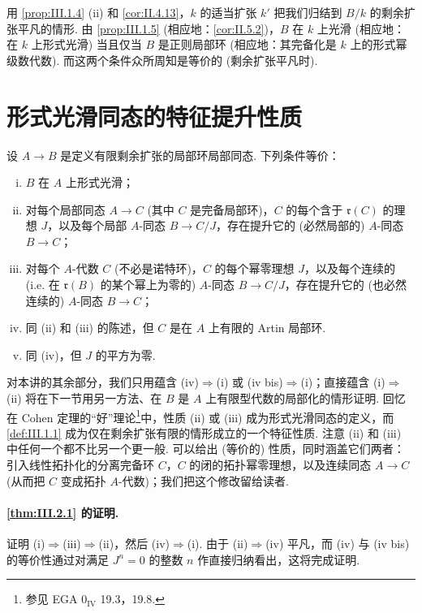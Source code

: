 用 \ref{prop:III.1.4} (ii) 和 \ref{cor:II.4.13}，$k$ 的适当扩张 $k'$ 把我们归结到 $B/k$ 的剩余扩张平凡的情形. 由 \ref{prop:III.1.5} (相应地：\ref{cor:II.5.2})，$B$ 在 $k$ 上光滑 (相应地：在 $k$ 上形式光滑) 当且仅当 $B$ 是正则局部环 (相应地：其完备化是 $k$ 上的形式幂级数代数). 而这两个条件众所周知是等价的 (剩余扩张平凡时).

\section{形式光滑同态的特征提升性质}

\begin{theorem}\label{thm:III.2.1}
设 $A \to B$ 是定义有限剩余扩张的局部环局部同态. 下列条件等价：
\begin{enumerate}[(i)]
\item $B$ 在 $A$ 上形式光滑；
\item 对每个局部同态 $A \to C$ (其中 $C$ 是完备局部环)，$C$ 的每个含于 $\mathfrak{r}(C)$ 的理想 $J$，以及每个局部 $A$-同态 $B \to C/J$，存在提升它的 (必然局部的) $A$-同态 $B \to C$；
\item 对每个 $A$-代数 $C$ (不必是诺特环)，$C$ 的每个幂零理想 $J$，以及每个连续的 (i.e. 在 $\mathfrak{r}(B)$ 的某个幂上为零的) $A$-同态 $B \to C/J$，存在提升它的 (也必然连续的) $A$-同态 $B \to C$；
\item 同 (ii) 和 (iii) 的陈述，但 $C$ 是在 $A$ 上有限的 Artin 局部环.
\item[(iv bis)] 同 (iv)，但 $J$ 的平方为零.
\end{enumerate}
\end{theorem}

\begin{remarkstar}
对本讲的其余部分，我们只用蕴含 (iv)$\Rightarrow$(i) 或 (iv bis)$\Rightarrow$(i)；直接蕴含 (i)$\Rightarrow$(ii) 将在下一节用另一方法、在 $B$ 是 $A$ 上有限型代数的局部化的情形证明. 回忆在 Cohen 定理的``好''理论\footnote{参见 EGA 0$_{\mathrm{IV}}$ 19.3，19.8.}中，性质 (ii) 或 (iii) 成为形式光滑同态的定义，而 \ref{def:III.1.1} 成为仅在剩余扩张有限的情形成立的一个特征性质. 注意 (ii) 和 (iii) 中任何一个都不比另一个更一般. 可以给出 (等价的) 性质，同时涵盖它们两者：引入线性拓扑化的分离完备环 $C$，$C$ 的闭的拓扑幂零理想，以及连续同态 $A \to C$ (从而把 $C$ 变成拓扑 $A$-代数)；我们把这个修改留给读者.
\end{remarkstar}

 \paragraph*{\ref{thm:III.2.1} 的证明.} 证明 (i)$\Rightarrow$(iii)$\Rightarrow$(ii)，然后 (iv)$\Rightarrow$(i). 由于 (ii)$\Rightarrow$(iv) 平凡，而 (iv) 与 (iv bis) 的等价性通过对满足 $J^n = 0$ 的整数 $n$ 作直接归纳看出，这将完成证明.

